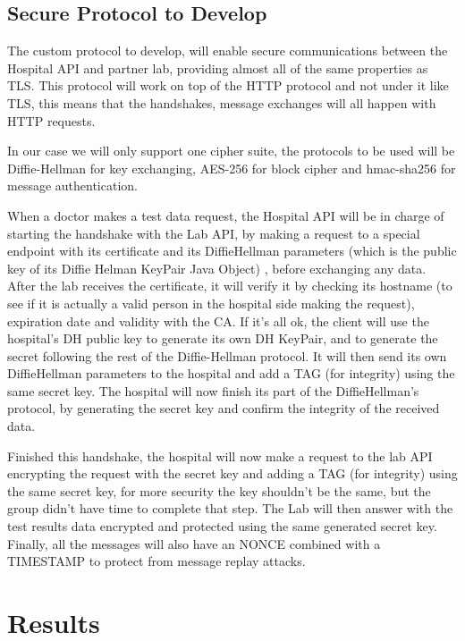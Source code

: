 \subsection{Secure Protocol to Develop}
The custom protocol to develop, will enable secure communications between the Hospital API and partner lab, providing almost all of the same properties as TLS.
This protocol will work on top of the HTTP protocol and not under it like TLS, this means that the handshakes, message exchanges will all happen with HTTP requests.

In our case we will only support one cipher suite, the protocols to be used will be Diffie-Hellman for key exchanging, AES-256 for block cipher and hmac-sha256 for message authentication.

When a doctor makes a test data request, the Hospital API will be in charge of starting the handshake with the Lab API, by making a request to a special endpoint with its certificate and its DiffieHellman parameters (which is the public key of its Diffie Helman KeyPair Java Object) , before exchanging any data.  After the lab receives the certificate, it will verify it by checking its hostname (to see if it is actually a valid person in the hospital side making the request), expiration date and validity with the CA. If it's all ok, the client will use the hospital's DH public key to generate its own DH KeyPair, and to generate the secret following the rest of the Diffie-Hellman protocol. It will then send its own DiffieHellman parameters to the hospital and add a TAG (for integrity) using the same secret key. The hospital will now finish its part of the DiffieHellman's protocol, by generating the secret key and confirm the integrity of the received data.

Finished this handshake, the hospital will now make a request to the lab API encrypting the request with the secret key and adding a TAG (for integrity) using the same secret key, for more security the key shouldn't be the same, but the group didn't have time to complete that step. The Lab will then answer with the test results data encrypted and protected using the same generated secret key. Finally, all the messages will also have an NONCE combined with a TIMESTAMP to protect from message replay attacks. \\


\section{Results}

